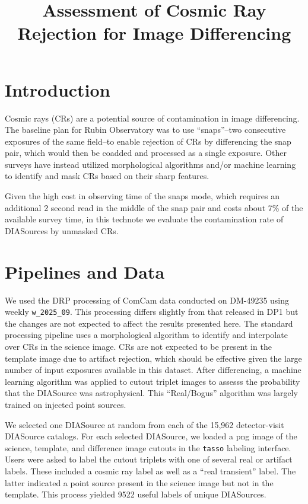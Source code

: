 \documentclass[DM,lsstdraft,authoryear,toc]{lsstdoc}
\title{Assessment of Cosmic Ray Rejection for Image Differencing}
\date{\vcsDate}
\begin{document}
\maketitle

\section{Introduction} \label{sec:intro}

Cosmic rays (CRs) are a potential source of contamination in image differencing.
The baseline plan for Rubin Observatory was to use ``snaps''--two consecutive exposures of the same field--to enable rejection of CRs by differencing the snap pair, which would then be coadded and processed as a single exposure.
Other surveys have instead utilized morphological algorithms and/or machine learning to identify and mask CRs based on their sharp features.

Given the high cost in observing time of the snaps mode, which requires an additional 2 second read in the middle of the snap pair and costs about 7\% of the available survey time, in this technote we evaluate the contamination rate of DIASources by unmasked CRs.

\section{Pipelines and Data} \label{sec:pipelines}

We used the DRP processing of ComCam data conducted on DM-49235 using weekly \texttt{w\_2025\_09}.
This processing differs slightly from that released in DP1 but the changes are not expected to affect the results presented here.
The standard processing pipeline uses a morphological algorithm to identify and interpolate over CRs in the science image.
CRs are not expected to be present in the template image due to artifact rejection, which should be effective given the large number of input exposures available in this dataset.
After differencing, a machine learning algorithm was applied to cutout triplet images to assesss the probability that the DIASource was astrophysical.
This ``Real/Bogus'' algorithm was largely trained on injected point sources.

We selected one DIASource at random from each of the 15,962 detector-visit DIASource catalogs.
For each selected DIASource, we loaded a png image of the science, template, and difference image cutouts in the \texttt{tasso} labeling interface.
Users were asked to label the cutout triplets with one of several real or artifact labels.
These included a cosmic ray label as well as a ``real transient'' label.
The latter indicated a point source present in the science image but not in the template.
This process yielded 9522 useful labels of unique DIASources.
\end{document}
